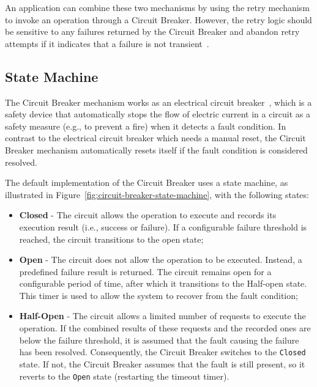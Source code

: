 An application can combine these two mechanisms by using the retry mechanism to invoke an operation through a Circuit Breaker.
However,
the retry logic should be sensitive to any failures returned by the Circuit Breaker
and abandon retry attempts
if it indicates that a failure is not transient~\cite{microsoft-cbreaker-pattern}.

\subsection{State Machine}\label{subsec:cbreaker-state-machine}

The Circuit Breaker mechanism works as an electrical circuit breaker~\cite{electrical-circuit-breaker},
which is a safety device that automatically stops the flow of electric current in a circuit as a safety measure
(e.g., to prevent a fire) when it detects a fault condition.
In contrast to the electrical circuit breaker which needs a manual reset,
the Circuit Breaker mechanism automatically resets itself if the fault condition is considered resolved.

The default implementation of the Circuit Breaker uses a state machine,
as illustrated in Figure~\ref{fig:circuit-breaker-state-machine}, with the following states:

\begin{itemize}
    \item \textbf{Closed} - The circuit allows the operation to execute and records its execution result
    (i.e., success or failure).
    If a configurable failure threshold is reached, the circuit transitions to the open state;
    \item \textbf{Open} - The circuit does not allow the operation to be executed.
    Instead, a predefined failure result is returned.
    The circuit remains open for a configurable period of time, after which it transitions to the Half-open state.
    This timer is used to allow the system to recover from the fault condition;
    \item \textbf{Half-Open} - The circuit allows a limited number of requests to execute the operation.
    If the combined results of these requests and the recorded ones are below the failure threshold, it is assumed that the fault causing the failure has been resolved.
    Consequently, the Circuit Breaker switches to the \texttt{Closed} state.
    If not,
    the Circuit Breaker assumes that the fault is still present,
    so it reverts to the \texttt{Open} state (restarting the timeout timer).
\end{itemize}

